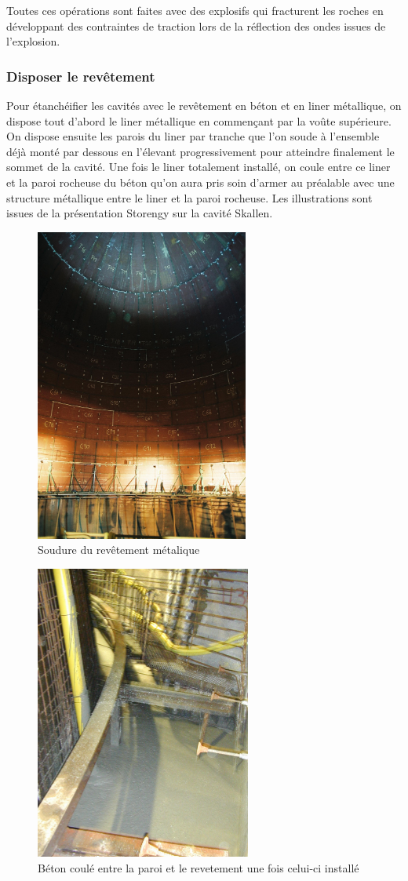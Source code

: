 \documentclass[11pt,french,a4paper]{article}
\begin{document}
Toutes ces opérations sont faites avec des explosifs qui fracturent les roches en développant des contraintes de traction lors de la réflection des ondes  issues de l’explosion.

\FloatBarrier
\subsubsection*{Disposer le revêtement}

Pour étanchéifier les cavités avec le revêtement en béton et en liner métallique, on dispose tout d’abord le liner métallique en commençant par la voûte supérieure. On dispose ensuite les parois du liner par tranche que l’on soude à l’ensemble déjà monté par dessous en l’élevant progressivement pour atteindre finalement le sommet de la cavité. Une fois le liner totalement installé, on coule entre ce liner et la paroi rocheuse du béton qu’on aura pris soin d’armer au préalable avec une structure métallique entre le liner et la paroi rocheuse.
Les illustrations sont issues de la présentation Storengy sur la cavité Skallen.

\begin{figure}[!h]
  \centering
  \includegraphics[width=.3\linewidth]{image/annexe/chap2/soudure.png}
  \caption{Soudure du revêtement métalique}
  \end{figure}
\begin{figure}[!h]
  \centering
  \includegraphics[width=.3\linewidth]{image/annexe/chap2/beton.png}
  \caption{Béton coulé entre la paroi et le revetement une fois celui-ci installé}
  \end{figure}
\end{document}
